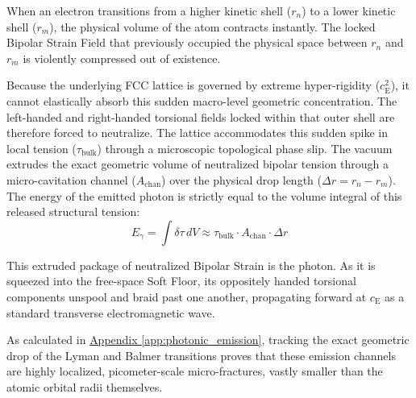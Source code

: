When an electron transitions from a higher kinetic shell ($r_n$) to a lower kinetic shell ($r_m$), the physical volume of the atom contracts instantly. The locked Bipolar Strain Field that previously occupied the physical space between $r_n$ and $r_m$ is violently compressed out of existence.

Because the underlying FCC lattice is governed by extreme hyper-rigidity ($c_{\mathrm{E}}^2$), it cannot elastically absorb this sudden macro-level geometric concentration. The left-handed and right-handed torsional fields locked within that outer shell are therefore forced to neutralize. The lattice accommodates this sudden spike in local tension ($\tau_{\mathrm{bulk}}$) through a microscopic topological phase slip. The vacuum extrudes the exact geometric volume of neutralized bipolar tension through a micro-cavitation channel ($A_{\mathrm{chan}}$) over the physical drop length ($\Delta r = r_n - r_m$). The energy of the emitted photon is strictly equal to the volume integral of this released structural tension:
\begin{equation}
    E_{\gamma} = \int \delta\tau \, dV \approx \tau_{\mathrm{bulk}} \cdot A_{\mathrm{chan}} \cdot \Delta r
\end{equation}

This extruded package of neutralized Bipolar Strain is the photon. As it is squeezed into the free-space Soft Floor, its oppositely handed torsional components unspool and braid past one another, propagating forward at $c_{\mathrm{E}}$ as a standard transverse electromagnetic wave.

As calculated in \hyperref[app:photonic_emission]{Appendix \ref*{app:photonic_emission}}, tracking the exact geometric drop of the Lyman and Balmer transitions proves that these emission channels are highly localized, picometer-scale micro-fractures, vastly smaller than the atomic orbital radii themselves.

